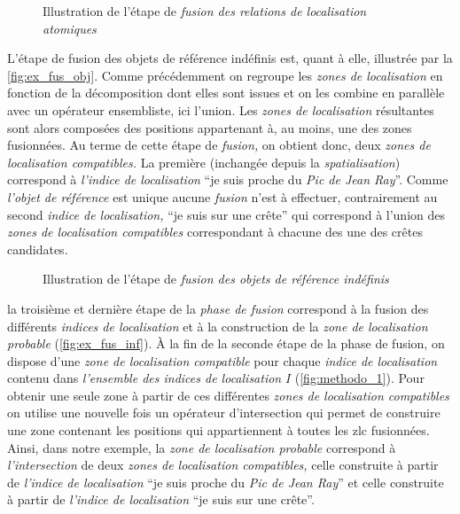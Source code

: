 \begin{figure}
  \centering
  
  \caption{Illustration de l'étape de \emph{fusion des relations de
      localisation atomiques}}
  \label{fig:ex_fus_rsa}
\end{figure}

L'étape de fusion des objets de référence indéfinis est, quant à elle,
illustrée par la \autoref{fig:ex_fus_obj}. Comme précédemment on
regroupe les \emph{zones de localisation} en fonction de la
décomposition dont elles sont issues et on les combine en parallèle
avec un opérateur ensembliste, ici l'union. Les \emph{zones de
  localisation} résultantes sont alors composées des positions
appartenant à, au moins, une des zones fusionnées. Au terme de cette
étape de \emph{fusion,} on obtient donc, deux \emph{zones de
  localisation compatibles.} La première (inchangée depuis la
\emph{spatialisation}) correspond à \emph{l'indice de localisation}
\enquote{je suis proche du \emph{Pic de Jean Ray}}. Comme
\emph{l'objet de référence} est unique aucune \emph{fusion} n'est à
effectuer, contrairement au second \emph{indice de localisation,}
\enquote{je suis sur une crête} qui correspond à l'union des
\emph{zones de localisation compatibles} correspondant à chacune des
une des crêtes candidates.

\begin{figure}
  \centering
  
  \caption{Illustration de l'étape de \emph{fusion des objets de
      référence indéfinis}}
  \label{fig:ex_fus_obj}
\end{figure}

la troisième et dernière étape de la \emph{phase de fusion} correspond
à la fusion des différents \emph{indices de localisation} et à la
construction de la \emph{zone de localisation probable}
(\autoref{fig:ex_fus_inf}). À la fin de la seconde étape de la phase
de fusion, on dispose d'une \emph{zone de localisation compatible}
pour chaque \emph{indice de localisation} contenu dans
\emph{l'ensemble des indices de localisation} \(I\)
(\autoref{fig:methodo_1}). Pour obtenir une seule zone à partir de ces
différentes \emph{zones de localisation compatibles} on utilise une
nouvelle fois un opérateur d'intersection qui permet de construire une
zone contenant les positions qui appartiennent à toutes les \ac{zlc}
fusionnées. Ainsi, dans notre exemple, la \emph{zone de localisation
  probable} correspond à \emph{l'intersection} de deux \emph{zones de
  localisation compatibles,} celle construite à partir de
\emph{l'indice de localisation} \enquote{je suis proche du \emph{Pic
    de Jean Ray}} et celle construite à partir de \emph{l'indice de
  localisation} \enquote{je suis sur une crête}.

